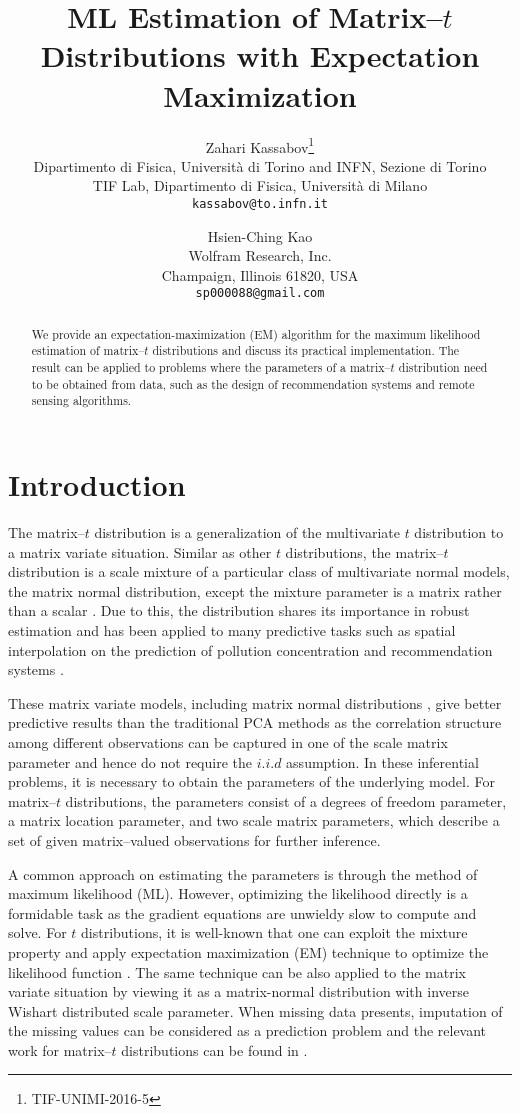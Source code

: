 \documentclass[english,listof=totoc]{scrartcl}
\title{ML Estimation of Matrix--$t$ Distributions with Expectation Maximization}
\author{Zahari Kassabov\thanks{TIF-UNIMI-2016-5}\\
        Dipartimento di Fisica, Universit\`a di Torino and INFN, Sezione di Torino\\
		TIF Lab, Dipartimento di Fisica, Universit\`a di Milano\\
        \texttt{kassabov@to.infn.it}\\
        \and
        Hsien-Ching Kao\\
        Wolfram Research, Inc.\\
		Champaign, Illinois 61820, USA\\
		\texttt{sp000088@gmail.com}
		}
\begin{document}
\maketitle

\begin{abstract}
We provide an expectation-maximization (EM) algorithm for the maximum likelihood estimation of matrix--$t$ distributions and discuss its practical implementation. The result can be applied to problems where the parameters of a matrix--$t$ distribution need to be obtained from data, such as the design of recommendation systems and remote sensing algorithms.
\end{abstract}

\section{Introduction}
The matrix--$t$ distribution is a generalization of the multivariate $t$ distribution to a matrix variate situation. Similar as other $t$ distributions, the matrix--$t$ distribution is a scale mixture of a particular class of multivariate normal models, the matrix normal distribution, except the mixture parameter is a matrix rather than a scalar \citep{gupta1999matrix}. Due to this, the distribution shares its importance in robust estimation and has been applied to many predictive tasks such as spatial interpolation on the prediction of pollution concentration \citep{KIBRIA2006785} and recommendation systems \citep{NIPS2007_3203}.

These matrix variate models, including matrix normal distributions \citep{2013arXiv1309.6609G}, give better predictive results than the traditional PCA methods as the correlation structure among different observations can be captured in one of the scale matrix parameter and hence do not require the $i.i.d$ assumption. In these inferential problems, it is necessary to obtain the parameters of the underlying model. For matrix--$t$ distributions, the parameters consist of a degrees of freedom parameter, a matrix location parameter, and two scale matrix parameters, which describe a set of given matrix--valued observations for further inference.

A common approach on estimating the parameters is through the method of maximum likelihood (ML). However, optimizing the likelihood directly is a formidable task as the gradient equations are unwieldy slow to compute and solve. For $t$ distributions, it is well-known that one can exploit the mixture property and apply expectation maximization (EM) technique to optimize the likelihood function \citep{10.2307/24305551}. The same technique can be also applied to the matrix variate situation by viewing it as a matrix-normal distribution with inverse Wishart distributed scale parameter. When missing data presents, imputation of the missing values can be considered as a prediction problem and the relevant work for matrix--$t$ distributions can be found in \cite{NIPS2007_3203}.
\end{document}
